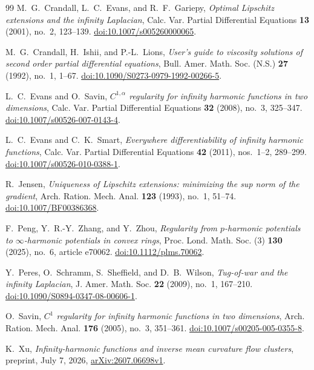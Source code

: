 \documentclass[11pt]{article}
\numberwithin{equation}{section}
\theoremstyle{definition}
\theoremstyle{remark}
\begin{document}
\begin{thebibliography}{99}
M.~G.~Crandall, L.~C.~Evans, and R.~F.~Gariepy,
\emph{Optimal Lipschitz extensions and the infinity Laplacian},
Calc. Var. Partial Differential Equations \textbf{13} (2001), no.~2, 123--139.
\href{https://doi.org/10.1007/s005260000065}{doi:10.1007/s005260000065}.

M.~G.~Crandall, H.~Ishii, and P.-L.~Lions,
\emph{User's guide to viscosity solutions of second order partial differential equations},
Bull. Amer. Math. Soc. (N.S.) \textbf{27} (1992), no.~1, 1--67.
\href{https://doi.org/10.1090/S0273-0979-1992-00266-5}{doi:10.1090/S0273-0979-1992-00266-5}.

L.~C.~Evans and O.~Savin,
\emph{$C^{1,\alpha}$ regularity for infinity harmonic functions in two dimensions},
Calc. Var. Partial Differential Equations \textbf{32} (2008), no.~3, 325--347.
\href{https://doi.org/10.1007/s00526-007-0143-4}{doi:10.1007/s00526-007-0143-4}.

L.~C.~Evans and C.~K.~Smart,
\emph{Everywhere differentiability of infinity harmonic functions},
Calc. Var. Partial Differential Equations \textbf{42} (2011), nos.~1--2, 289--299.
\href{https://doi.org/10.1007/s00526-010-0388-1}{doi:10.1007/s00526-010-0388-1}.

R.~Jensen,
\emph{Uniqueness of Lipschitz extensions: minimizing the sup norm of the gradient},
Arch. Ration. Mech. Anal. \textbf{123} (1993), no.~1, 51--74.
\href{https://doi.org/10.1007/BF00386368}{doi:10.1007/BF00386368}.

F.~Peng, Y.~R.-Y.~Zhang, and Y.~Zhou,
\emph{Regularity from $p$-harmonic potentials to $\infty$-harmonic potentials in convex rings},
Proc. Lond. Math. Soc. (3) \textbf{130} (2025), no.~6, article e70062.
\href{https://doi.org/10.1112/plms.70062}{doi:10.1112/plms.70062}.

Y.~Peres, O.~Schramm, S.~Sheffield, and D.~B.~Wilson,
\emph{Tug-of-war and the infinity Laplacian},
J. Amer. Math. Soc. \textbf{22} (2009), no.~1, 167--210.
\href{https://doi.org/10.1090/S0894-0347-08-00606-1}{doi:10.1090/S0894-0347-08-00606-1}.

O.~Savin,
\emph{$C^1$ regularity for infinity harmonic functions in two dimensions},
Arch. Ration. Mech. Anal. \textbf{176} (2005), no.~3, 351--361.
\href{https://doi.org/10.1007/s00205-005-0355-8}{doi:10.1007/s00205-005-0355-8}.

K.~Xu,
\emph{Infinity-harmonic functions and inverse mean curvature flow clusters},
preprint, July 7, 2026,
\href{https://arxiv.org/abs/2607.06698v1}{arXiv:2607.06698v1}.

\end{thebibliography}
\end{document}
